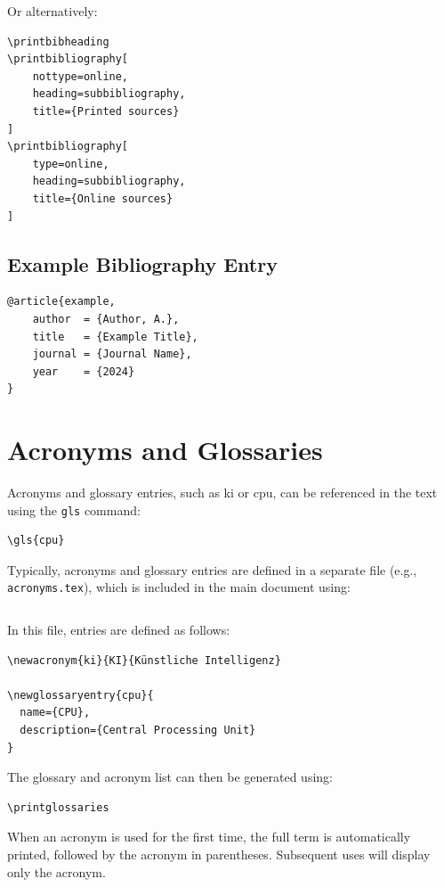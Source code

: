 Or alternatively:

\begin{verbatim}
\printbibheading
\printbibliography[
    nottype=online,
    heading=subbibliography,
    title={Printed sources}
]
\printbibliography[
    type=online,
    heading=subbibliography,
    title={Online sources}
]
\end{verbatim}

\subsection{Example Bibliography Entry}

\begin{verbatim}
@article{example,
    author  = {Author, A.},
    title   = {Example Title},
    journal = {Journal Name},
    year    = {2024}
}
\end{verbatim}

\section{Acronyms and Glossaries}

Acronyms and glossary entries, such as \gls{ki} or \gls{cpu}, can be referenced in the text using the \texttt{gls} command:

\begin{verbatim}
\gls{cpu}
\end{verbatim}

Typically, acronyms and glossary entries are defined in a separate file (e.g., \texttt{acronyms.tex}), which is included in the main document using:

\begin{verbatim}

\end{verbatim}

In this file, entries are defined as follows:

\begin{verbatim}
\newacronym{ki}{KI}{Künstliche Intelligenz}

\newglossaryentry{cpu}{
  name={CPU},
  description={Central Processing Unit}
}
\end{verbatim}

The glossary and acronym list can then be generated using:

\begin{verbatim}
\printglossaries
\end{verbatim}

When an acronym is used for the first time, the full term is automatically printed, followed by the acronym in parentheses. Subsequent uses will display only the acronym.

